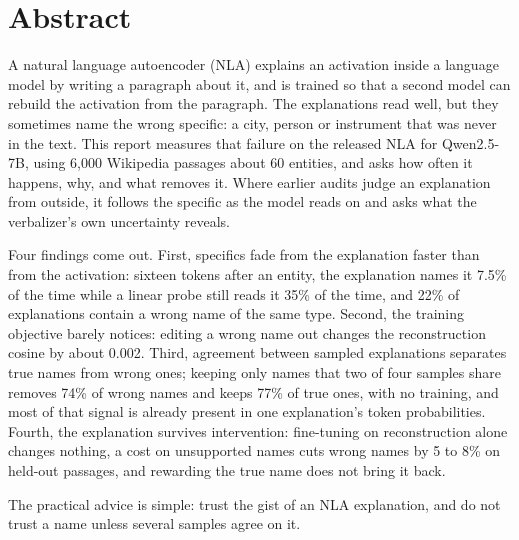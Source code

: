 \chapter*{Abstract}

A natural language autoencoder (NLA) explains an activation inside a language model by writing a paragraph
about it, and is trained so that a second model can rebuild the activation from the paragraph. The
explanations read well, but they sometimes name the wrong specific: a city, person or instrument that was
never in the text. This report measures that failure on the released NLA for Qwen2.5-7B, using 6{,}000
Wikipedia passages about 60 entities, and asks how often it happens, why, and what removes it. Where earlier
audits judge an explanation from outside, it follows the specific as the model reads on and asks what the
verbalizer's own uncertainty reveals.

Four findings come out. First, specifics fade from the explanation faster than from the activation: sixteen
tokens after an entity, the explanation names it 7.5\% of the time while a linear probe still reads it 35\%
of the time, and 22\% of explanations contain a wrong name of the same type. Second, the training objective
barely notices: editing a wrong name out changes the reconstruction cosine by about 0.002. Third, agreement
between sampled explanations separates true names from wrong ones; keeping only names that two of four
samples share removes 74\% of wrong names and keeps 77\% of true ones, with no training, and most of that
signal is already present in one explanation's token probabilities. Fourth, the explanation survives
intervention: fine-tuning on reconstruction alone changes nothing, a cost on unsupported names cuts wrong
names by 5 to 8\% on held-out passages, and rewarding the true name does not bring it back.

The practical advice is simple: trust the gist of an NLA explanation, and do not trust a name unless
several samples agree on it.

\vspace{0.6cm}
\noindent{}
